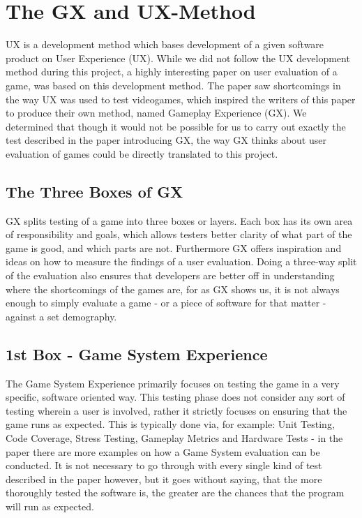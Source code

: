 \section{The GX and UX-Method}

UX is a development method which bases development of a given software product on User Experience (UX). While we did not follow the UX development 
method during this project, a highly interesting paper on user evaluation of a game, was based on this development method. The paper saw shortcomings 
in the way UX was used to test videogames, which inspired the writers of this paper to produce their own method, named Gameplay Experience (GX).
We determined that though it would not be possible for us to carry out exactly the test described in the paper introducing GX, the way GX thinks about 
user evaluation of games could be directly translated to this project.

\subsection{The Three Boxes of GX}

GX splits testing of a game into three boxes or layers. Each box has its own area of responsibility and goals, which allows testers better clarity of 
what part of the game is good, and which parts are not. Furthermore GX offers inspiration and ideas on how to measure the findings of a user 
evaluation. Doing a three-way split of the evaluation also ensures that developers are better off in understanding where the shortcomings of the games 
are, for as GX shows us, it is not always enough to simply evaluate a game - or a piece of software for that matter - against a set demography.

\subsection{1st Box - Game System Experience}

The Game System Experience primarily focuses on testing the game in a very specific, software oriented way. This testing phase does not consider any 
sort of testing wherein a user is involved, rather it strictly focuses on ensuring that the game runs as expected. This is typically done via, for 
example: Unit Testing, Code Coverage, Stress Testing, Gameplay Metrics and Hardware Tests - in the paper there are more examples on how a Game System 
evaluation can be conducted. It is not necessary to go through with every single kind of test described in the paper however, but it goes without 
saying, that the more thoroughly tested the software is, the greater are the chances that the program will run as expected.

